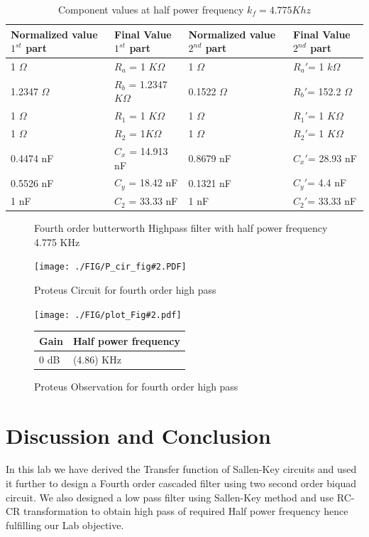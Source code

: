 \documentclass[a4paper,11pt]{article}
\newcommand{\Porcirobs}[4]{
    \begin{figure}[H] %
        \centering
        \texttt{[image: ./FIG/P\_cir\_fig\#2.PDF]}
        \caption{Proteus Circuit for #2}
    \end{figure}


    \begin{figure}[H]  %
        \centering
        \texttt{[image: ./FIG/plot\_Fig\#2.pdf]}
        \begin{tabular}[H]{| m{14em}| m{22em}|}
            \hline
            \rowcolor[rgb]{0.569,0.647,0.947} \textbf{Gain } & \textbf{Half power frequency} \\ \hline
            #3 dB         & (#4) KHz     \\  \hline
        \end{tabular}
        \caption{Proteus Observation for #2}
    \end{figure}
}
\begin{document}
\begin{table}[H]
    \centering
    \begin{tabular}[H]{| m{8em}|m{8em}|m{8em}|m{8em}|}
        \hline
        \rowcolor[rgb]{0.569,0.647,0.947}
        \textbf{ Normalized value $1^{st}$ part}
                          & \textbf{Final Value $1^{st}$ part}
                          & \textbf{Normalized value $2^{nd}$ part}
                          & \textbf{Final Value $2^{nd}$ part}                                                     \\ \hline
        1 $ \Omega $      & $R_a$ = 1  $ K\Omega $                  & 1 $ \Omega $      & $R_a'$=  1 $ k\Omega $   \\ \hline
        1.2347 $ \Omega $ & $R_b$ = 1.2347 $ K\Omega $              & 0.1522 $ \Omega $ & $R_b'$= 152.2 $ \Omega $ \\ \hline
        1 $ \Omega $      & $R_1$ = 1  $ K\Omega $                  & 1 $ \Omega $      & $R_1'$= 1  $ K\Omega $   \\ \hline
        1 $ \Omega $      & $R_2$ = 1$ K\Omega $                    & 1 $ \Omega $      & $R_2'$= 1 $ K\Omega $    \\ \hline
        0.4474 nF         & $C_x$ = 14.913 nF                       & 0.8679 nF         & $C_x'$=   28.93 nF       \\ \hline
        0.5526 nF         & $C_y$ = 18.42 nF                        & 0.1321 nF         & $C_y'$=   4.4 nF         \\ \hline
        1 nF              & $C_2$ = 33.33 nF                        & 1 nF              & $C_2'$=    33.33 nF      \\ \hline
    \end{tabular}
    \caption{Component values at half power frequency $k_f =4.775 Khz$}
\end{table}


\begin{figure}[H]
    \centering
    \scalebox{1.15}
    \figfourthorderhpfinal
    \caption{Fourth order butterworth Highpass filter with half power frequency 4.775 KHz}
\end{figure}


\Porcirobs{0.95}{fourth order high pass}{0}{4.86}



\section{Discussion and Conclusion}
In this lab we have derived the Transfer function of Sallen-Key circuits and used it further to design a Fourth order cascaded filter using two second order biquad circuit.
We also designed a low pass filter using Sallen-Key method and use RC-CR transformation to obtain high pass of required Half power frequency hence fulfilling our Lab objective.
\end{document}
